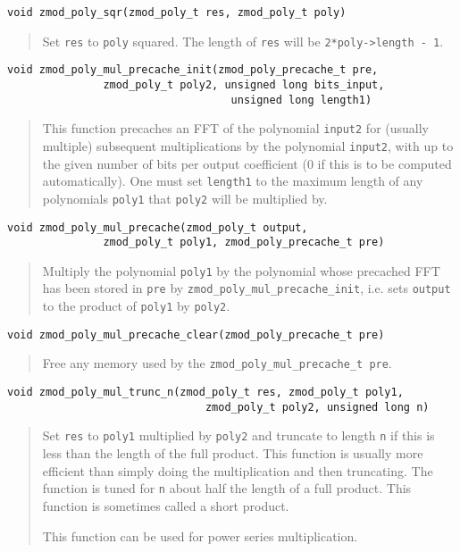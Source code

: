\documentclass[a4paper,10pt]{article}
\newcommand{\code}{\lstinline}
\begin{document}
\begin{lstlisting}
void zmod_poly_sqr(zmod_poly_t res, zmod_poly_t poly)
\end{lstlisting}
\begin{quote}
Set \code{res} to \code{poly} squared. The length of \code{res} will be \code{2*poly->length - 1}.

\end{quote}

\begin{lstlisting}
void zmod_poly_mul_precache_init(zmod_poly_precache_t pre,
               zmod_poly_t poly2, unsigned long bits_input,
                                   unsigned long length1)
\end{lstlisting}
\begin{quote}
This function precaches an FFT of the polynomial \code{input2} for (usually multiple) subsequent multiplications by the polynomial \code{input2}, with up to the given number of bits per output coefficient (0 if this is to be computed automatically). One must set \code{length1} to the maximum length of any polynomials \code{poly1} that \code{poly2} will be multiplied by.  
\end{quote}

\begin{lstlisting}
void zmod_poly_mul_precache(zmod_poly_t output,
               zmod_poly_t poly1, zmod_poly_precache_t pre)
\end{lstlisting}
\begin{quote}
Multiply the polynomial \code{poly1} by the polynomial whose precached FFT has been stored in \code{pre} by \code{zmod_poly_mul_precache_init}, i.e. sets \code{output} to the product of \code{poly1} by \code{poly2}. 
\end{quote}

\begin{lstlisting}
void zmod_poly_mul_precache_clear(zmod_poly_precache_t pre)
\end{lstlisting}
\begin{quote}
Free any memory used by the \code{zmod_poly_mul_precache_t pre}.
\end{quote}

\begin{lstlisting}
void zmod_poly_mul_trunc_n(zmod_poly_t res, zmod_poly_t poly1, 
                               zmod_poly_t poly2, unsigned long n)
\end{lstlisting}
\begin{quote}
Set \code{res} to \code{poly1} multiplied by \code{poly2} and truncate to length \code{n} if this is less than the length of the full product. This function is usually more efficient than simply doing the multiplication and then truncating. The function is tuned for \code{n} about half the length of a full product. This function is sometimes called a short product.

This function can be used for power series multiplication.
\end{quote}
\end{document}
